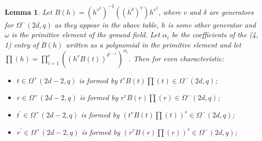 \documentclass[12pt]{report}
\newtheorem{lemma}[definition]{Lemma}
\begin{document}
\begin{lemma}
Let $B(h) = (h^{v^2})^{-1} ({(h^\delta)^v}) h^{v^2}$, where $v$ and $\delta$ are generators for $\Omega^-(2d, q)$ as they appear in the above table, $h$ is some other generator and $\omega$ is the primitive element of the ground field. Let $\alpha_i$ be the coefficients of the (4, 1) entry of $B(h)$ written as a polynomial in the primitive element and let $\prod(h) = \prod_{i = 1}^{e} ((h^v B(t))^{\delta^{i-1}})^{\alpha_i}$. Then for even characteristic:
\begin{itemize}
\item $t \in \Omega^+(2d-2, q)$ is formed by ${t^v} B(t) \prod(t)  \in \Omega^-(2d, q)$;
\item $r \in \Omega^+(2d-2, q)$ is formed by ${r^v} B(r) \prod(r) \in \Omega^-(2d, q)$;
\item $t^\prime \in \Omega^+(2d-2, q)$ is formed by $({t^v} B(t) \prod(t))^s \in \Omega^-(2d, q)$;
\item $r^\prime \in \Omega^+(2d-2, q)$ is formed by $({r^v} B(r) \prod(r))^s \in \Omega^-(2d, q)$;
\end{itemize}

\end{lemma}
\end{document}
